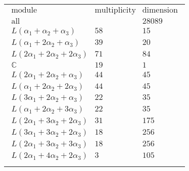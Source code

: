 \documentclass[crop,border=2mm]{standalone}
\begin{document}
\begin{tabular}{l}
$\displaystyle
\begin{array}{rll}
	\text{module}&\text{multiplicity}&\text{dimension} \\ \hline \text{all}&&28089 \\
	L\left(\alpha_{1}+\alpha_{2}+\alpha_{3}\right)&58&15\\
	L\left(\alpha_{1}+ 2\alpha_{2}+\alpha_{3}\right)&39&20\\
	L\left( 2\alpha_{1}+ 2\alpha_{2}+ 2\alpha_{3}\right)&71&84\\
	\mathbb{C}&19&1\\
	L\left( 2\alpha_{1}+ 2\alpha_{2}+\alpha_{3}\right)&44&45\\
	L\left(\alpha_{1}+ 2\alpha_{2}+ 2\alpha_{3}\right)&44&45\\
	L\left( 3\alpha_{1}+ 2\alpha_{2}+\alpha_{3}\right)&22&35\\
	L\left(\alpha_{1}+ 2\alpha_{2}+ 3\alpha_{3}\right)&22&35\\
	L\left( 2\alpha_{1}+ 3\alpha_{2}+ 2\alpha_{3}\right)&31&175\\
	L\left( 3\alpha_{1}+ 3\alpha_{2}+ 2\alpha_{3}\right)&18&256\\
	L\left( 2\alpha_{1}+ 3\alpha_{2}+ 3\alpha_{3}\right)&18&256\\
	L\left( 2\alpha_{1}+ 4\alpha_{2}+ 2\alpha_{3}\right)&3&105
\end{array}
$ \\ \\

\end{tabular}
\end{document}
